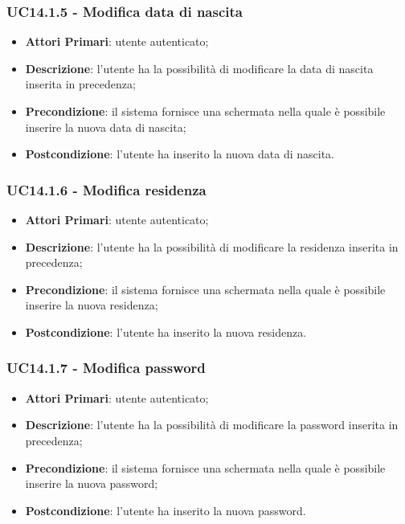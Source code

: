 \subsubsection{UC14.1.5 - Modifica data di nascita}
\begin{itemize}
	\item \textbf{Attori Primari}: utente autenticato;
	\item \textbf{Descrizione}: l'utente ha la possibilità di modificare la data di nascita inserita in precedenza;
	\item \textbf{Precondizione}: il sistema fornisce una schermata nella quale è possibile inserire la nuova data di nascita;
	\item \textbf{Postcondizione}: l'utente ha inserito la nuova data di nascita.
\end{itemize}

\subsubsection{UC14.1.6 - Modifica residenza}
\begin{itemize}
	\item \textbf{Attori Primari}: utente autenticato;
	\item \textbf{Descrizione}: l'utente ha la possibilità di modificare la residenza inserita in precedenza;
	\item \textbf{Precondizione}: il sistema fornisce una schermata nella quale è possibile inserire la nuova residenza;
	\item \textbf{Postcondizione}: l'utente ha inserito la nuova residenza.
\end{itemize}

\subsubsection{UC14.1.7 - Modifica password}
\begin{itemize}
	\item \textbf{Attori Primari}: utente autenticato;
	\item \textbf{Descrizione}: l'utente ha la possibilità di modificare la password inserita in precedenza;
	\item \textbf{Precondizione}: il sistema fornisce una schermata nella quale è possibile inserire la nuova password;
	\item \textbf{Postcondizione}: l'utente ha inserito la nuova password.
\end{itemize}

